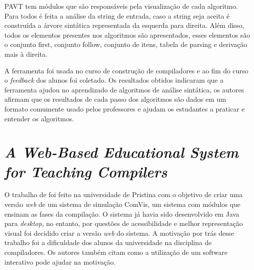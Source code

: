 PAVT tem módulos que são responsáveis pela visualização de cada algoritmo. Para todos é feita a análise da string de entrada, caso a string seja aceita é construída a árvore sintática representada da esquerda para direita. Além disso, todos os elementos presentes nos algoritmos são apresentados, esses elementos são o conjunto first, conjunto follow, conjunto de itens, tabela de parsing e derivação mais à direita.

A ferramenta foi usada no curso de construção de compiladores e ao fim do curso o \textit{feedback} dos alunos foi coletado. Os resultados obtidos indicaram que a ferramenta ajudou no aprendizado de algoritmos de análise sintática, os autores afirmam que os resultados de cada passo dos algoritmos são dados em um formato comumente usado pelos professores e ajudam os estudantes a praticar e entender os algoritmos.



\section{\textit{A Web-Based Educational System for Teaching Compilers}}
O trabalho de \textcite{webbased} foi feito na universidade de Pristina com o objetivo de criar uma versão \textit{web} de um sistema de simulação ComVis, um sistema com módulos que ensinam as fases da compilação. O sistema já havia sido desenvolvido em Java para \textit{desktop}, no entanto, por questões de acessibilidade e melhor representação visual foi decidido criar a versão \textit{web} do sistema. A motivação por trás desse trabalho foi a dificuldade dos alunos da universidade na disciplina de compiladores. Os autores também citam como a utilização de um software interativo pode ajudar na motivação.

